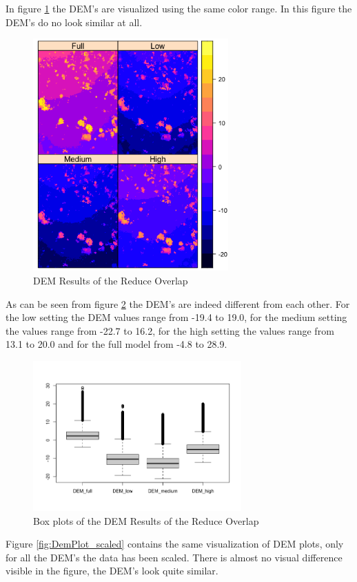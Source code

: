 \documentclass{isprs} %
\begin{document}
In figure \ref{fig:DemPlot_unscaled} the DEM's are visualized using the same color range. 
In this figure the DEM's do no look similar at all.

\begin{figure}[h!]
    \centering
    \includegraphics[width=7.5cm]{DEM2x2.png}
    \caption{DEM Results of the Reduce Overlap}
    \label{fig:DemPlot_unscaled}
\end{figure}

As can be seen from figure \ref{fig:BoxPlot_unscaled} the DEM's are indeed different from each other. 
For the low setting the DEM values range from -19.4 to 19.0, for the medium setting the values range from -22.7 to 16.2, for the high setting the values range from 13.1 to 20.0 and for the full model from -4.8 to 28.9.

\begin{figure}[h!]
    \centering
    \includegraphics[width=8cm]{DemBoxplot.png}
    \caption{Box plots of the DEM Results of the Reduce Overlap}
    \label{fig:BoxPlot_unscaled}
\end{figure}

Figure \ref{fig:DemPlot_scaled} contains the same visualization of DEM plots, only for all the DEM's the data has been scaled.
There is almost no visual difference visible in the figure, the DEM's look quite similar.
\end{document}
